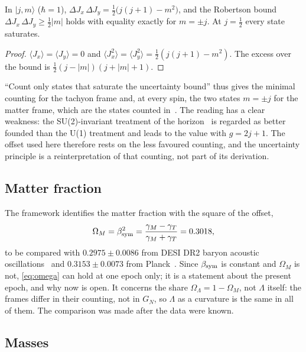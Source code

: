 \begin{proposition}\label{prop:robertson}
In \(|j,m\rangle\) (\(\hbar=1\)), \(\Delta J_x\,\Delta J_y=\tfrac12\bigl(j(j+1)-m^2\bigr)\), and the Robertson bound \(\Delta J_x\,\Delta J_y\ge\tfrac12|m|\)
holds with equality exactly for \(m=\pm j\).  At \(j=\tfrac12\) every state saturates.
\end{proposition}

\begin{proof}
\(\langle J_x\rangle=\langle J_y\rangle=0\) and \(\langle J_x^2\rangle=\langle J_y^2\rangle=\tfrac12(j(j+1)-m^2)\).  The excess over the bound is
\(\tfrac12(j-|m|)(j+|m|+1)\).
\end{proof}

``Count only states that saturate the uncertainty bound'' thus gives the minimal counting for the tachyon frame and, at every spin, the
two states \(m=\pm j\) for the matter frame, which are the states counted in~\cite{meissner}.  The reading has a clear weakness: the
SU(2)-invariant treatment of the horizon~\cite{enp} is regarded as better founded than the U(1) treatment and leads to the value with
\(g=2j+1\).  The offset used here therefore rests on the less favoured counting, and the uncertainty principle is a reinterpretation of that
counting, not part of its derivation.

\subsection{Matter fraction}

The framework identifies the matter fraction with the square of the offset,
\begin{equation}\label{eq:omega}
\Omega_M=\beta_{\rm sym}^2=\frac{\gamma_M-\gamma_T}{\gamma_M+\gamma_T}=0.3018 ,
\end{equation}
to be compared with \(0.2975\pm0.0086\) from DESI DR2 baryon acoustic oscillations~\cite{desi} and \(0.3153\pm0.0073\) from Planck~\cite{planck}.  Since
\(\beta_{\rm sym}\) is constant and \(\Omega_M\) is not, \eqref{eq:omega} can hold at one epoch only; it is a statement about the present epoch,
and why now is open.  It concerns the share \(\Omega_\Lambda=1-\Omega_M\), not \(\Lambda\) itself: the frames differ in their counting, not in
\(G_N\), so \(\Lambda\) as a curvature is the same in all of them.  The comparison was made after the data were known.

\subsection{Masses}

